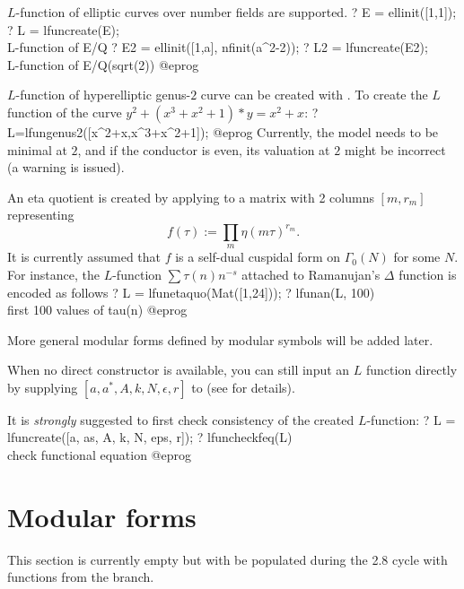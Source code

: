 
$L$-function of elliptic curves over number fields are supported.
\bprog
? E = ellinit([1,1]);
? L = lfuncreate(E);  \\ L-function of E/Q
? E2 = ellinit([1,a], nfinit(a^2-2));
? L2 = lfuncreate(E2);  \\ L-function of E/Q(sqrt(2))
@eprog

$L$-function of hyperelliptic genus-$2$ curve can be created with
. To create the $L$ function of the curve
$y^2+(x^3+x^2+1)*y = x^2+x$:
\bprog
? L=lfungenus2([x^2+x,x^3+x^2+1]);
@eprog
Currently, the model needs to be minimal at $2$, and if the conductor is even,
its valuation at $2$ might be incorrect (a warning is issued).


An eta quotient is created by applying  to a matrix with
2 columns $[m, r_m]$ representing
$$ f(\tau) := \prod_m \eta(m\tau)^{r_m}. $$
It is currently assumed that $f$ is a self-dual cuspidal form on
$\Gamma_0(N)$ for some $N$.
For instance, the $L$-function $\sum \tau(n) n^{-s}$
attached to Ramanujan's $\Delta$ function is encoded as follows
\bprog
? L = lfunetaquo(Mat([1,24]));
? lfunan(L, 100)  \\ first 100 values of tau(n)
@eprog

More general modular forms defined by modular symbols will be added later.


When no direct constructor is available, you can still input an $L$ function
directly by supplying $[a, a^*,A, k, N, \epsilon, r]$ to 
(see  for details).

It is \emph{strongly} suggested to first check consistency of the created
$L$-function:
\bprog
? L = lfuncreate([a, as, A, k, N, eps, r]);
? lfuncheckfeq(L)  \\ check functional equation
@eprog


\section{Modular forms}

This section is currently empty but with be populated during the 2.8 cycle
with functions from the  branch.


